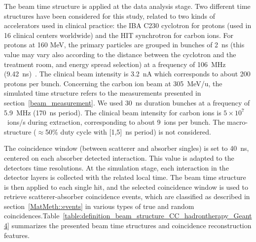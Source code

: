 The beam time structure is applied at the data analysis stage. Two different time structures have been considered for this study, related to two kinds of accelerators used in clinical practice: the IBA C230 cyclotron for protons (used in 16 clinical centers worldwide) and the HIT synchrotron for carbon ions. For protons at 160 MeV, the primary particles are grouped in bunches of 2~ns (this value may vary also according to the distance between the cyclotron and the treatment room, and energy spread selection) at a frequency of 106~MHz (9.42~ns)~\cite{Roellinghoff_2014}. The clinical beam intensity is 3.2~nA which corresponds to about 200 protons per bunch. Concerning the carbon ion beam at 305~MeV/u, the simulated time structure refers to the measurements presented in section~\ref{beam_measurement}. We used 30~ns duration bunches at a frequency of 5.9~MHz (170~ns period). The clinical beam intensity for carbon ions is $5\times10^7$~ions/s during extraction, corresponding to about 9~ions per bunch. The macro-structure ($\approx$50\% duty cycle with [1,5]~ns period) is not considered. 

The coincidence window (between scatterer and absorber singles) is set to 40~ns, centered on each absorber detected interaction. This value is adapted to the detectors time resolutions. At the simulation stage, each interaction in the detector layers is collected with the related local time. The beam time structure is then applied to each single hit, and the selected coincidence window is used to retrieve scatterer-absorber coincidence events, which are classified as described in section~\ref{MatMeth::events} in various types of true and random coincidences.Table~\ref{table:definition_beam_structure_CC_hadrontherapy_Geant4} summarizes the presented beam time structures and coincidence reconstruction features.

